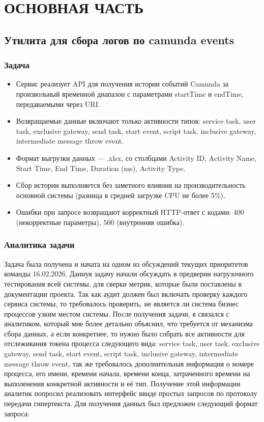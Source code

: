 \section{ОСНОВНАЯ ЧАСТЬ}



\subsection{Утилита для сбора логов по camunda events}

\subsubsection{Задача}
\begin{itemize}
  \item Сервис реализует API для получения истории событий Camunda за произвольный временной диапазон с параметрами startTime и endTime, передаваемыми через URI.
  \item Возвращаемые данные включают только активности типов: service task, user task, exclusive gateway, send task, start event, script task, inclusive gateway, intermediate message throw event.
  \item Формат выгрузки данных — .xlsx, со столбцами Activity ID, Activity Name, Start Time, End Time, Duration (ms), Activity Type.
  \item Сбор истории выполняется без заметного влияния на производительность основной системы (разница в средней загрузке CPU не более 5\%).
  \item Ошибки при запросе возвращают корректный HTTP-ответ с кодами: 400 (некорректные параметры), 500 (внутренняя ошибка).

\end{itemize}

\subsubsection{Аналитика задачи}

Задача была получена и начата на одном из обсуждений текущих приоритетов команды 16.02.2026.
Даннуя задачу начали обсуждать в предверии нагрузочного тестирования всей системы, для сверки метрик,
которые были поставлены в документации проекта. Так как аудит должен был включать проверку каждого сервиса системы, 
то требовалось проверить, не является ли система бизнес процессов узким местом системы. После получения задачи, я связался с аналитиком, который 
мне более детально объяснил, что требуется от механизма сбора данных, а если конкретнее, то нужно было собрать все 
активности для отслеживания токена процесса следующего вида: service task, user task, exclusive gateway, send task, start event,
script task, inclusive gateway, intermediate message throw event, так же требовалось дополнительная информация о номере процесса, его имени, времени начала, 
времени конца, затраченного времени на выполенения конкретной активности и её тип. 
Получение этой информации аналитик попросил реализовать интерфейс ввиде простых запросов по протоколу передачи гипертекста. Для получения данных был предложен следующий формат запроса:

